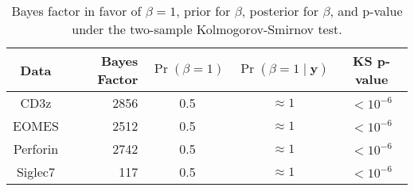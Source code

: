 \documentclass[12pt]{article} %
\begin{document}
\begin{table}
  \centering
  \begin{tabular}{|c|rccc|}
    \hline 
    Data & Bayes Factor & $\Pr(\beta=1)$ &
    $\Pr(\beta=1\mid \bm y)$ & KS p-value \\
    \hline 
    CD3z     & 2856 & 0.5 & $\approx 1$ & $<10^{-6}$ \\
    EOMES    & 2512 & 0.5 & $\approx 1$ & $<10^{-6}$ \\
    Perforin & 2742 & 0.5 & $\approx 1$ & $<10^{-6}$ \\
    Siglec7  &  117 & 0.5 & $\approx 1$ & $<10^{-6}$ \\
    \hline
  \end{tabular}
  \caption{Bayes factor in favor of $\beta=1$, prior for $\beta$, posterior
  for $\beta$, and p-value under the two-sample Kolmogorov-Smirnov test.}
  \label{tab:data-results}
\end{table}

% 
\end{document}
